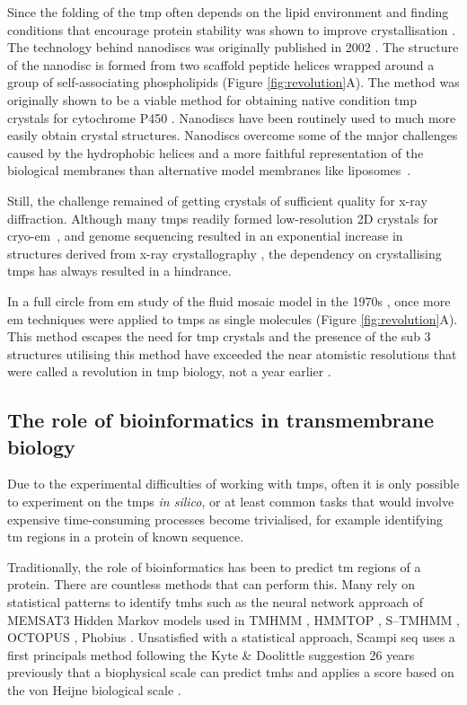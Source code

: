 Since the folding of the \gls{tmp} often depends on the lipid environment and finding conditions that encourage protein stability was shown to improve crystallisation \cite{Carpenter2008, Rosenbusch2001}.
The technology behind nanodiscs was originally published in 2002 \cite{Bayburt2002}.
The structure of the nanodisc is formed from two scaffold peptide helices wrapped around a group of self\--associating phospholipids (Figure \ref{fig:revolution}A).
The method was originally shown to be a viable method for obtaining native condition \gls{tmp} crystals for cytochrome P450 \cite{Duan2004}.
Nanodiscs have been routinely used to much more easily obtain crystal structures.
Nanodiscs overcome some of the major challenges caused by the hydrophobic helices and a more faithful representation of the biological membranes than alternative model membranes like liposomes~\cite{Borch2009}.

Still, the challenge remained of getting crystals of sufficient quality for x\--ray diffraction.
Although many \gls{tmp}s readily formed low\--resolution 2D crystals for cryo\--\gls{em}~\cite{Vinothkumar2015, Raunser2009}, and genome sequencing resulted in an exponential increase in structures derived from x\--ray crystallography \cite{Vinothkumar2010}, the dependency on crystallising \gls{tmp}s has always resulted in a hindrance.

In a full circle from \gls{em} study of the fluid mosaic model in the 1970s \cite{Singer1972}, once more \gls{em} techniques were applied to \gls{tmp}s as single molecules (Figure \ref{fig:revolution}A).
This method escapes the need for \gls{tmp} crystals \cite{Vinothkumar2015} and the presence of the sub 3\angstrom~ structures \cite{Grant2015, Bartesaghi2015} utilising this method have exceeded the near atomistic resolutions that were called a revolution in \gls{tmp} biology, not a year earlier \cite{Kuhlbrandt2014}.


\subsection{The role of bioinformatics in transmembrane biology}

Due to the experimental difficulties of working with \gls{tmp}s, often it is only possible to experiment on the \gls{tmp}s \textit{in silico}, or at least common tasks that would involve expensive time\--consuming processes become trivialised, for example identifying \gls{tm} regions in a protein of known sequence.

Traditionally, the role of bioinformatics has been to predict \gls{tm} regions of a protein.
There are countless methods that can perform this.
Many rely on statistical patterns to identify \gls{tmh}s such as the neural network approach of MEMSAT3 \cite{Jones2007} Hidden Markov models used in TMHMM \cite{Krogh2001}, HMMTOP \cite{Tusnady2001}, S--TMHMM \cite{Viklund2004}, OCTOPUS \cite{Viklund2008}, Phobius \cite{Kall2004}.
Unsatisfied with a statistical approach, Scampi seq \cite{Bernsel2008} uses a first principals method following the Kyte \& Doolittle suggestion 26 years previously that a biophysical scale can predict \gls{tmh}s \cite{Kyte1982} and applies a score based on the von Heijne biological scale \cite{Hessa2007}.

